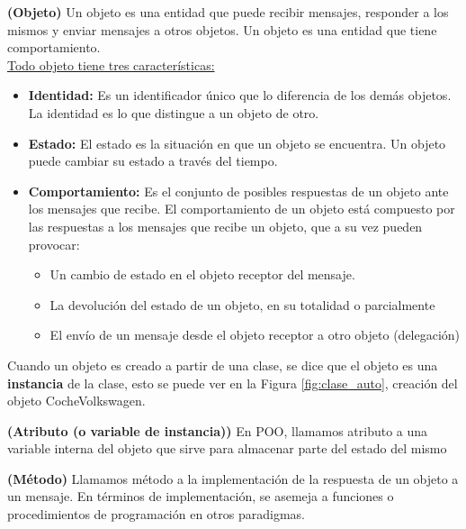 \documentclass[../main.tex]{subfiles}
\begin{document}
        \begin{definition} \textbf{(Objeto)}
            Un objeto es una entidad que puede recibir mensajes, responder a los mismos y enviar mensajes a otros objetos. Un objeto es una entidad que tiene comportamiento.\\

            \underline{Todo objeto tiene tres características:}
            \begin{itemize}
                \item \textbf{Identidad:} Es un identificador único que lo diferencia de los demás objetos. La identidad es lo que distingue a un objeto de otro.
                \item \textbf{Estado:} El estado es la situación en que un objeto se encuentra. Un objeto puede cambiar su estado a través del tiempo.
                \item \textbf{Comportamiento:} Es el conjunto de posibles respuestas de un objeto ante los mensajes que recibe. El comportamiento de un objeto está compuesto por las respuestas a los mensajes que recibe un objeto, que a su vez pueden provocar:
                    \begin{itemize}
                        \item Un cambio de estado en el objeto receptor del mensaje.
                        \item La devolución del estado de un objeto, en su totalidad o parcialmente
                        \item El envío de un mensaje desde el objeto receptor a otro objeto (delegación)
                    \end{itemize}
            \end{itemize}

            Cuando un objeto es creado a partir de una clase, se dice que el objeto es una \textbf{instancia} de la clase, esto se puede ver en la Figura \ref{fig:clase_auto}, creación del objeto CocheVolkswagen.
        \end{definition}

        \begin{definition} \textbf{(Atributo (o variable de instancia))}
            En POO, llamamos atributo a una variable interna del objeto que sirve para almacenar parte del estado del mismo
        \end{definition}

        \begin{definition} \textbf{(Método)}
            Llamamos método a la implementación de la respuesta de un objeto a un mensaje. En términos de implementación, se asemeja a funciones o procedimientos de programación en otros paradigmas.
        \end{definition}
\end{document}
